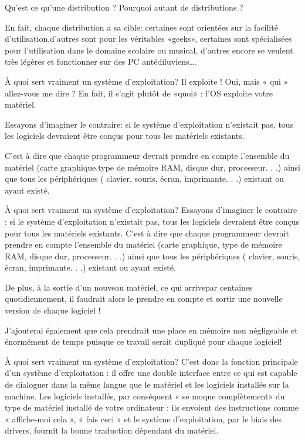 \documentclass[10pt]{beamer}
\begin{document}
\begin{frame}{Qu'est ce qu'une distribution ?}
Pourquoi autant de distributions ? 

En fait, chaque distribution a sa cible: certaines sont orientées sur la facilité d'utilisation,d'autres sont pour les véritables «geeks», certaines sont spécialisées pour l'utilisation dans le domaine scolaire ou musical, d'autres encore se veulent très légères et fonctionner sur des
PC antédiluviens\ldots.
\end{frame}

\begin{frame}{À quoi sert vraiment un système d'exploitation?}
Il exploite ! Oui, mais « qui » allez-vous me dire ? En fait, il s'agit plutôt de «quoi» : l'OS exploite votre matériel.

\pause
Essayons d'imaginer le contraire: si le système d'exploitation n'existait pas, tous
les logiciels devraient être conçus pour tous les matériels existants.

C'est à dire que chaque programmeur devrait prendre en compte l'ensemble du matériel (carte graphique,type de mémoire RAM, disque dur, processeur. . .) ainsi que tous les périphériques
( clavier, souris, écran, imprimante. . .) existant ou ayant existé.
\end{frame}

\begin{frame}{À quoi sert vraiment un système d'exploitation?}
Essayons d'imaginer le contraire : si le système d'exploitation n'existait pas, tous
les logiciels devraient être conçus pour tous les matériels existants. C'est à dire que chaque programmeur devrait prendre en compte l'ensemble du matériel (carte graphique, type de mémoire RAM, disque dur, processeur. . .) ainsi que tous les périphériques ( clavier, souris, écran, imprimante. . .) existant ou ayant existé.
\pause

De plus, à la sortie d'un nouveau matériel, ce qui arrivepar centaines
quotidiennement, il faudrait alors le prendre en compte et sortir une nouvelle
version de chaque logiciel !

J'ajouterai également que cela prendrait une place en mémoire non négligeable et
énormément de temps puisque ce travail serait dupliqué pour chaque logiciel! 
\end{frame}
\begin{frame}{À quoi sert vraiment un système d'exploitation?}
C'est donc la fonction principale d'un système d'exploitation
: il offre une double
interface entre ce qui est capable de dialoguer dans la même langue que le matériel
et les logiciels installés sur la machine. Les logiciels installés, par conséquent « se
moque   complètement»   du   type   de   matériel   installé   de   votre   ordinateur
:   ils
envoient des instructions comme « affiche-moi cela », « fais ceci » et le système
d'exploitation, par le biais des drivers, fournit la bonne traduction dépendant du
matériel.
\end{frame}
\end{document}
